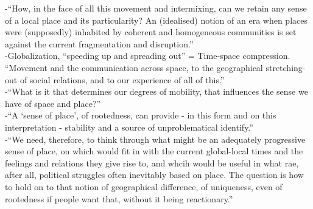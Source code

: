 -{\color{orange}“How, in the face of all this movement and intermixing, can we retain any sense of a local place and its particularity? An (idealised) notion of an era when places were (supposedly) inhabited by coherent and homogeneous communities is set against the current fragmentation and disruption.”}\cite{MasseyD1991}\\
-{\color{orange}Globalization, “speeding up and spreading out” = Time-space compression. “Movement and the communication across space, to the geographical stretching-out of social relations, and to our experience of all of this.”}\cite{MasseyD1991}\\
-{\color{orange}“What is it that determines our degrees of mobility, that influences the sense we have of space and place?”}\cite{MasseyD1991}\\
-{\color{orange}“A ‘sense of place’, of rootedness, can provide - in this form and on this interpretation - stability and a source of unproblematical identify.”}\cite{MasseyD1991}\\
-{\color{orange}“We need, therefore, to think through what might be an adequately progressive sense of place, on which would fit in with the current global-local times and the feelings and relations they give rise to, and whcih would be useful in what rae, after all, political struggles often inevitably based on place. The question is how to hold on to that notion of geographical difference, of uniqueness, even of rootedness if people want that, without it being reactionary.”}\cite{MasseyD1991}\\

